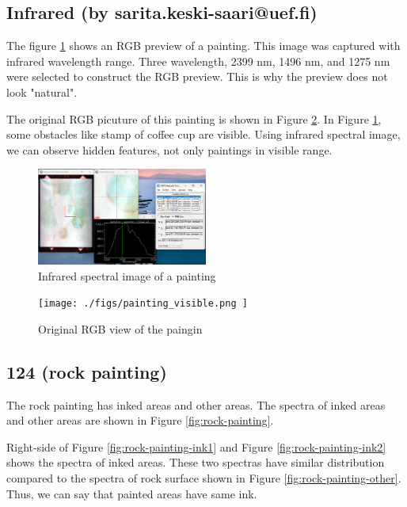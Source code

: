 \subsection{Infrared (by sarita.keski-saari@uef.fi)}

The figure \ref{fig:painting} shows an RGB preview of a painting.
This image was captured with infrared wavelength range. Three
wavelength, 2399 nm, 1496 nm, and 1275 nm were selected to construct
the RGB preview. This is why the preview does not look "natural".

The original RGB picuture of this painting is shown in Figure
\ref{fig:painting-org}.
In Figure \ref{fig:painting}, some obstacles like stamp of coffee cup
are visible. Using infrared spectral image, we can observe hidden
features, not only paintings in visible range.

\begin{figure}[H]
  \centering
  \caption{Infrared spectral image of a painting}
  \label{fig:painting}
  \includegraphics[width=0.5\textwidth]{./figs/painting.png}
\end{figure}

\begin{figure}[H]
  \centering
  \caption{Original RGB view of the paingin}
  \label{fig:painting-org}
  \texttt{[image: ./figs/painting\_visible.png ]}
\end{figure}

\subsection{124 (rock painting)}

The rock painting has inked areas and other areas. The spectra of
inked areas and other areas are shown in Figure \ref{fig:rock-painting}.

Right-side of Figure \ref{fig:rock-painting-ink1} and Figure
\ref{fig:rock-painting-ink2} shows the spectra of inked areas. These
two spectras have similar distribution compared to the spectra of
rock surface shown in Figure \ref{fig:rock-painting-other}. Thus, we
can say that painted areas have same ink.

